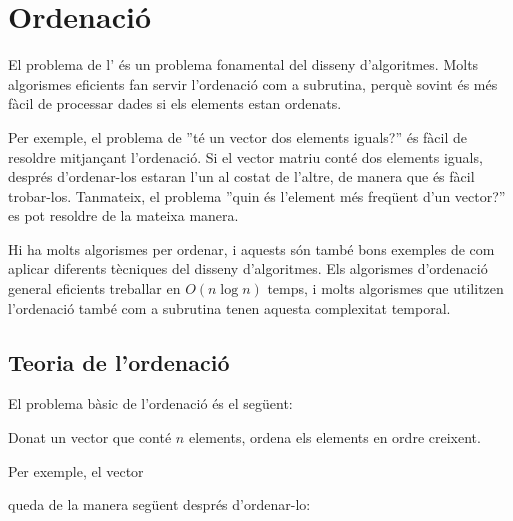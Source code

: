\chapter{Ordenació}

El problema de l'
és un problema fonamental del disseny d'algoritmes.
Molts algorismes eficients
fan servir l'ordenació com a subrutina,
perquè sovint és més fàcil de processar
dades si els elements estan ordenats.

Per exemple, el problema de ''té un vector
dos elements iguals?'' és fàcil de resoldre mitjançant l'ordenació.
Si el vector matriu conté dos elements iguals,
després d'ordenar-los estaran l'un al costat de l'altre,
de manera que és fàcil trobar-los.
Tanmateix, el problema ''quin és l'element més freqüent
d'un vector?'' es pot resoldre de la mateixa manera.

Hi ha molts algorismes per ordenar, i aquests són
també bons exemples de com aplicar
diferents tècniques del disseny d'algoritmes.
Els algorismes d'ordenació general eficients
treballar en $O(n \log n)$ temps,
i molts algorismes que utilitzen l'ordenació
també com a subrutina
tenen aquesta complexitat temporal.

\section{Teoria de l'ordenació}

El problema bàsic de l'ordenació és el següent:
\begin{framed}
\noindent
Donat un vector que conté $n$ elements,
ordena els elements en ordre creixent.
\end{framed}
\noindent
Per exemple, el vector
\begin{centre}
\end{centre}
queda de la manera següent després d'ordenar-lo:
\begin{centre}
\end{centre}

